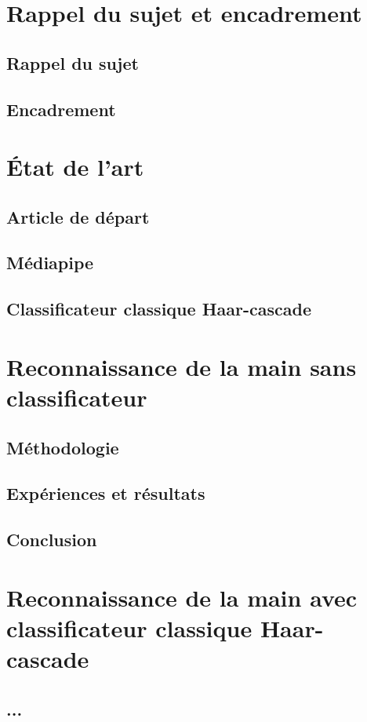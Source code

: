 \documentclass[11pt]{article}
\begin{document}
\newpage

\section{Rappel du sujet et encadrement}
\subsection{Rappel du sujet}
\subsection{Encadrement}
\newpage

\section{\'Etat de l'art}
\subsection{Article de départ}
\subsection{Médiapipe}
\subsection{Classificateur classique Haar-cascade}
\newpage

\section{Reconnaissance de la main sans classificateur}
\subsection{Méthodologie}
\subsection{Expériences et résultats}
\subsection{Conclusion}
\newpage

\section{Reconnaissance de la main avec classificateur classique Haar-cascade}
\subsection{...}
\end{document}
